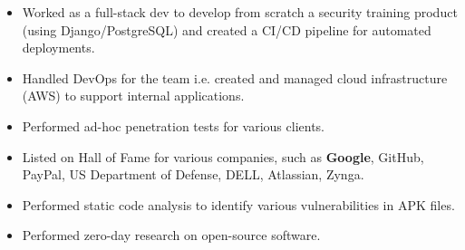 \documentclass[10pt,a4paper,ragged2e]{altacv}
\begin{document}

  \begin{fullwidth}
  \makecvheader
  \end{fullwidth}


  \begin{itemize}
      \item Worked as a full-stack dev to develop from scratch a security training product (using Django/PostgreSQL) and created a CI/CD pipeline for automated deployments.
      \item Handled DevOps for the team i.e. created and managed cloud infrastructure (AWS) to support internal applications.
      \item Performed ad-hoc penetration tests for various clients.
  \end{itemize}
  \divider
  \begin{itemize}
  
  \item Listed on Hall of Fame for various companies, such as \textbf{Google}, GitHub, PayPal, US Department of Defense, DELL, Atlassian, Zynga.
\item Performed static code analysis to identify various vulnerabilities in APK files.
  \item Performed zero-day research on open-source software.
 
  \end{itemize}

  \divider
\end{document}
